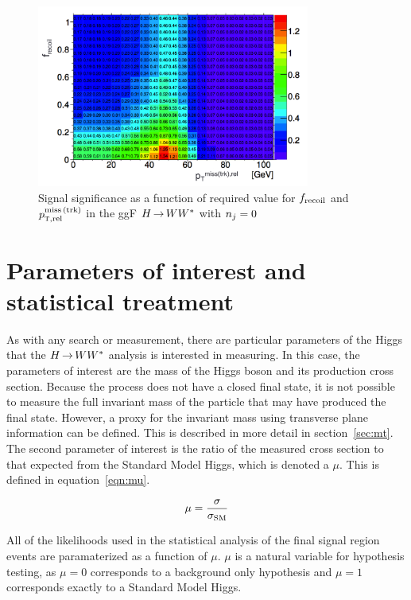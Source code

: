 \begin{figure}[h!]
  \centering
  \captionsetup{justification=centering}

  \includegraphics[width=0.8\textwidth]{figures/SFoptimization}
  \caption{Signal significance as a function of required value for $f_{\rm recoil}$ and $p_{{\textrm{\footnotesize\sc t}},{\rm rel}}^{\rm miss\,(trk)}$ in the ggF $H{\,{\rightarrow}\,}WW^\ast$ with $n_j = 0$}
  \label{fig:optimization}
\end{figure}


\section{Parameters of interest and statistical treatment}
 
As with any search or measurement, there are particular parameters of the Higgs that the $H{\,{\rightarrow}\,}WW^\ast$ analysis is interested in measuring. In this case, the parameters of interest are the mass of the Higgs boson and its production cross section. Because the \HWWfull process does not have a closed final state, it is not possible to measure the full invariant mass of the particle that may have produced the final state. However, a proxy for the invariant mass using transverse plane information can be defined. This is described in more detail in section~\ref{sec:mt}. The second parameter of interest is the ratio of the measured cross section to that expected from the Standard Model Higgs, which is denoted a $\mu$. This is defined in equation~\ref{eqn:mu}.

\begin{equation}
\mu = \frac{\sigma}{\sigma_{\rm SM}}
\label{eqn:mu}
\end{equation}

All of the likelihoods used in the statistical analysis of the final signal region events are paramaterized as a function of $\mu$. $\mu$ is a natural variable for hypothesis testing, as $\mu = 0$ corresponds to a background only hypothesis and $\mu = 1$ corresponds exactly to a Standard Model Higgs. 

